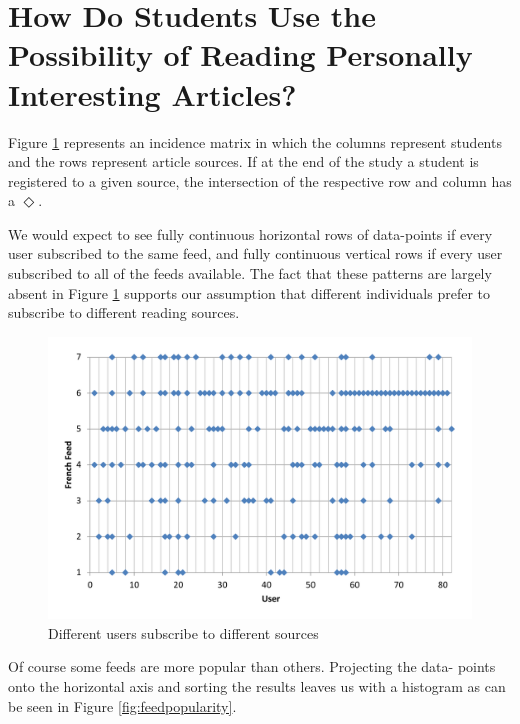 
\section{How Do Students Use the Possibility of Reading Personally Interesting Articles?}
\label{sec:results}


Figure \ref{fig:subscriptions} represents an incidence matrix in which the columns represent students and the rows represent article sources. If at the end of the study a student is registered to a given source, the intersection of the respective row and column has a $\Diamond$. 

We would expect to see fully continuous horizontal rows of data-points if every user subscribed to the same feed, and fully continuous vertical rows if every user subscribed to all of the feeds available. The fact that these patterns are largely absent in Figure \ref{fig:subscriptions} supports our assumption that different individuals prefer to subscribe to different reading sources.


\begin{figure}[h!]

\centering
  \includegraphics[width=0.7\columnwidth]{figures/users_feeds}
  \caption{Different users subscribe to different sources}
  \label{fig:subscriptions}  
\end{figure}

Of course some feeds are more popular than others. Projecting the data- points onto the horizontal axis and sorting the results leaves us with a histogram as can be seen in Figure \ref{fig:feedpopularity}.

